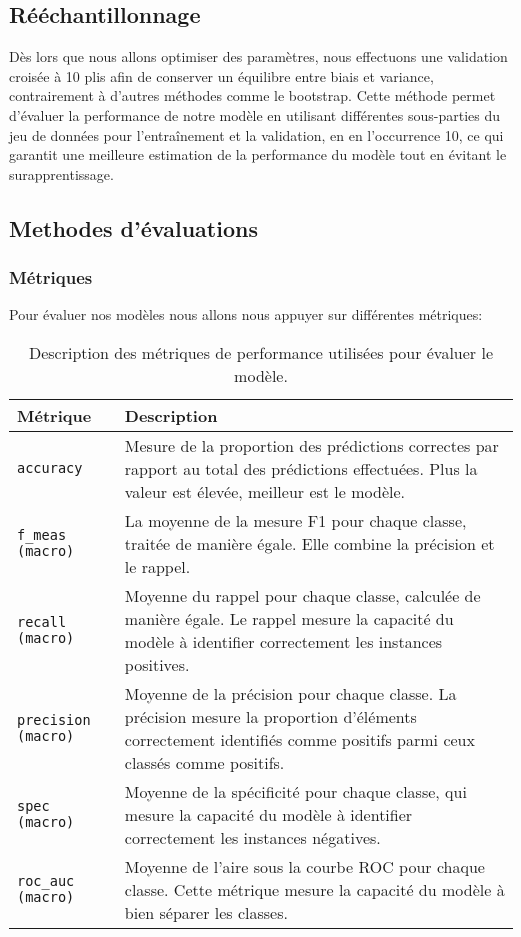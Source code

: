 \documentclass[a4paper,11pt]{article}
\begin{document}
\subsection{Rééchantillonnage}

Dès lors que nous allons optimiser des paramètres, nous effectuons une validation croisée à 10 plis afin de conserver un équilibre entre biais et variance, contrairement à d'autres méthodes comme le bootstrap. Cette méthode permet d'évaluer la performance de notre modèle en utilisant différentes sous-parties du jeu de données pour l'entraînement et la validation, en en l'occurrence 10, ce qui garantit une meilleure estimation de la performance du modèle tout en évitant le surapprentissage.

\subsection{Methodes d'évaluations}

\subsubsection{Métriques}

Pour évaluer nos modèles nous allons nous appuyer sur différentes métriques:

\begin{table}[H]
\centering
\small
\renewcommand{\arraystretch}{1.2}
\begin{tabular}{|l|p{10cm}|}
\hline
\textbf{Métrique} & \textbf{Description} \\
\hline
\texttt{accuracy} & Mesure de la proportion des prédictions correctes par rapport au total des prédictions effectuées. Plus la valeur est élevée, meilleur est le modèle. \\
\texttt{f\_meas (macro)} & La moyenne de la mesure F1 pour chaque classe, traitée de manière égale. Elle combine la précision et le rappel. \\
\texttt{recall (macro)} & Moyenne du rappel pour chaque classe, calculée de manière égale. Le rappel mesure la capacité du modèle à identifier correctement les instances positives. \\
\texttt{precision (macro)} & Moyenne de la précision pour chaque classe. La précision mesure la proportion d'éléments correctement identifiés comme positifs parmi ceux classés comme positifs. \\
\texttt{spec (macro)} & Moyenne de la spécificité pour chaque classe, qui mesure la capacité du modèle à identifier correctement les instances négatives. \\
\texttt{roc\_auc (macro)} & Moyenne de l'aire sous la courbe ROC pour chaque classe. Cette métrique mesure la capacité du modèle à bien séparer les classes. \\
\hline
\end{tabular}
\caption{Description des métriques de performance utilisées pour évaluer le modèle.}
\end{table}
\end{document}

